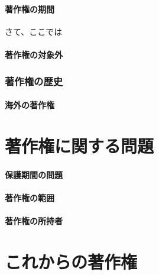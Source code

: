 \documentclass[a4j]{jsarticle}
\begin{document}
\subsection*{著作権の期間}
さて、ここでは
\subsection*{著作権の対象外}
\section{著作権の歴史}
\subsection*{海外の著作権}
\part{著作権に関する問題}
\subsection{保護期間の問題}
\subsection{著作権の範囲}
\subsection{著作権の所持者}
\part{これからの著作権}
\end{document}
